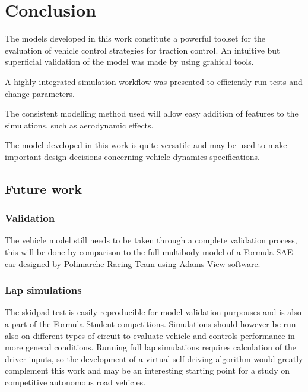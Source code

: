 \chapter{Conclusion}
\label{chap:conclusion}
The models developed in this work constitute a powerful toolset for the evaluation of vehicle control strategies for traction control.
An intuitive but superficial validation of the model was made by using grahical tools.

A highly integrated simulation workflow was presented to efficiently run tests and change parameters.

The consistent modelling method used will allow easy addition of features to the simulations, such as aerodynamic effects.

The model developed in this work is quite versatile and may be used to make important design decisions concerning vehicle dynamics specifications.
\section{Future work}
\subsection{Validation}
The vehicle model still needs to be taken through a complete validation process, this will be done by comparison to the full multibody model of a Formula SAE car designed by Polimarche Racing Team using Adams View software.
\subsection{Lap simulations}
The skidpad test is easily reproducible for model validation purpouses and is also a part of the Formula Student competitions. Simulations should however be run also on different types of circuit to evaluate vehicle and controls performance in more general conditions.
Running full lap simulations requires calculation of the driver inputs, so the development of a virtual self-driving algorithm would greatly complement this work and may be an interesting starting point for a study on competitive autonomous road vehicles.
